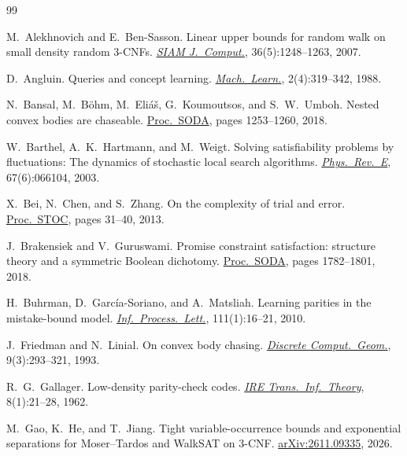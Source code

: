 \documentclass[11pt,a4paper]{article}
\theoremstyle{definition}
\theoremstyle{remark}
\begin{document}
\begin{thebibliography}{99}

M.~Alekhnovich and E.~Ben-Sasson.
\newblock Linear upper bounds for random walk on small density random 3-CNFs.
\newblock \href{https://doi.org/10.1137/S0097539704440107}{\emph{SIAM J.\ Comput.}}, 36(5):1248--1263, 2007.

D.~Angluin.
\newblock Queries and concept learning.
\newblock \href{https://doi.org/10.1007/BF00116828}{\emph{Mach.\ Learn.}}, 2(4):319--342, 1988.

N.~Bansal, M.~B\"ohm, M.~Eli\'{a}\v{s}, G.~Koumoutsos, and S.~W.~Umboh.
\newblock Nested convex bodies are chaseable.
\newblock \href{https://doi.org/10.1137/1.9781611975031.81}{Proc.\ SODA}, pages 1253--1260, 2018.

W.~Barthel, A.~K.~Hartmann, and M.~Weigt.
\newblock Solving satisfiability problems by fluctuations: The dynamics of stochastic local search algorithms.
\newblock \href{https://doi.org/10.1103/PhysRevE.67.066104}{\emph{Phys.\ Rev.\ E}}, 67(6):066104, 2003.

X.~Bei, N.~Chen, and S.~Zhang.
\newblock On the complexity of trial and error.
\newblock \href{https://doi.org/10.1145/2488608.2488613}{Proc.\ STOC}, pages 31--40, 2013.

J.~Brakensiek and V.~Guruswami.
\newblock Promise constraint satisfaction: structure theory and a symmetric Boolean dichotomy.
\newblock \href{https://doi.org/10.1137/1.9781611975031.117}{Proc.\ SODA}, pages 1782--1801, 2018.

H.~Buhrman, D.~Garc\'{i}a-Soriano, and A.~Matsliah.
\newblock Learning parities in the mistake-bound model.
\newblock \href{https://doi.org/10.1016/j.ipl.2010.10.009}{\emph{Inf.\ Process.\ Lett.}}, 111(1):16--21, 2010.

J.~Friedman and N.~Linial.
\newblock On convex body chasing.
\newblock \href{https://doi.org/10.1007/BF02189324}{\emph{Discrete Comput.\ Geom.}}, 9(3):293--321, 1993.

R.~G.~Gallager.
\newblock Low-density parity-check codes.
\newblock \href{https://doi.org/10.1109/TIT.1962.1057683}{\emph{IRE Trans.\ Inf.\ Theory}}, 8(1):21--28, 1962.

M.~Gao, K.~He, and T.~Jiang.
\newblock Tight variable-occurrence bounds and exponential separations for Moser--Tardos and WalkSAT on 3-CNF.
\newblock \href{https://arxiv.org/abs/2611.09335}{arXiv:2611.09335}, 2026.


\end{thebibliography}
\end{document}
